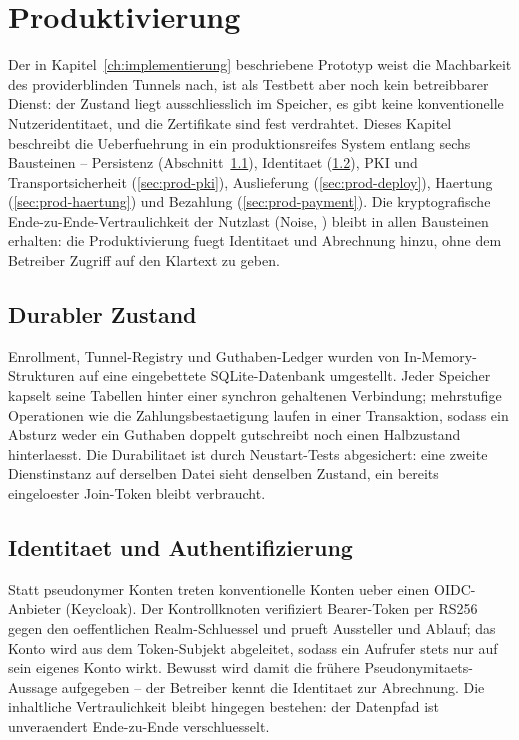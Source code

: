 \chapter{Produktivierung}
\label{ch:produktivierung}

Der in Kapitel~\ref{ch:implementierung} beschriebene Prototyp weist die
Machbarkeit des providerblinden Tunnels nach, ist als Testbett aber noch kein
betreibbarer Dienst: der Zustand liegt ausschliesslich im Speicher, es gibt
keine konventionelle Nutzeridentitaet, und die Zertifikate sind fest
verdrahtet. Dieses Kapitel beschreibt die Ueberfuehrung in ein
produktionsreifes System entlang sechs Bausteinen -- Persistenz
(Abschnitt~\ref{sec:prod-persistenz}), Identitaet
(\ref{sec:prod-identitaet}), PKI und Transportsicherheit
(\ref{sec:prod-pki}), Auslieferung (\ref{sec:prod-deploy}), Haertung
(\ref{sec:prod-haertung}) und Bezahlung (\ref{sec:prod-payment}). Die
kryptografische Ende-zu-Ende-Vertraulichkeit der Nutzlast (Noise,
\cite{perrin2018noise}) bleibt in allen Bausteinen erhalten: die
Produktivierung fuegt Identitaet und Abrechnung hinzu, ohne dem Betreiber
Zugriff auf den Klartext zu geben.

\section{Durabler Zustand}
\label{sec:prod-persistenz}

Enrollment, Tunnel-Registry und Guthaben-Ledger wurden von
In-Memory-Strukturen auf eine eingebettete SQLite-Datenbank umgestellt. Jeder
Speicher kapselt seine Tabellen hinter einer synchron gehaltenen Verbindung;
mehrstufige Operationen wie die Zahlungsbestaetigung laufen in einer
Transaktion, sodass ein Absturz weder ein Guthaben doppelt gutschreibt noch
einen Halbzustand hinterlaesst. Die Durabilitaet ist durch Neustart-Tests
abgesichert: eine zweite Dienstinstanz auf derselben Datei sieht denselben
Zustand, ein bereits eingeloester Join-Token bleibt verbraucht.

\section{Identitaet und Authentifizierung}
\label{sec:prod-identitaet}

Statt pseudonymer Konten treten konventionelle Konten ueber einen
OIDC-Anbieter (Keycloak). Der Kontrollknoten verifiziert Bearer-Token per
RS256 gegen den oeffentlichen Realm-Schluessel und prueft Aussteller und
Ablauf; das Konto wird aus dem Token-Subjekt abgeleitet, sodass ein Aufrufer
stets nur auf sein eigenes Konto wirkt. Bewusst wird damit die frühere
Pseudonymitaets-Aussage aufgegeben -- der Betreiber kennt die Identitaet zur
Abrechnung. Die inhaltliche Vertraulichkeit bleibt hingegen bestehen: der
Datenpfad ist unveraendert Ende-zu-Ende verschluesselt.

